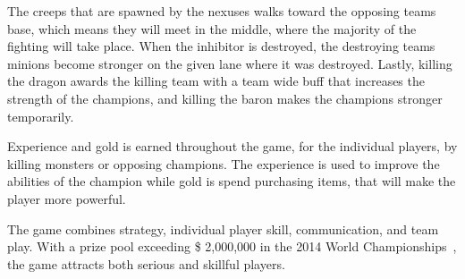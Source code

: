 The creeps that are spawned by the nexuses walks toward the opposing teams base, which means they will meet in the middle, where the majority of the fighting will take place. When the inhibitor is destroyed, the destroying teams minions become stronger on the given lane where it was destroyed. Lastly, killing the dragon awards the killing team with a team wide buff that increases the strength of the champions, and killing the baron makes the champions stronger temporarily.

Experience and gold is earned throughout the game, for the individual players, by killing monsters or opposing champions. The experience is used to improve the abilities of the champion while gold is spend purchasing items, that will make the player more powerful.

The game combines strategy, individual player skill, communication, and team play.
With a prize pool exceeding \$ 2,000,000 in the 2014 World Championships~\cite{lolprize}, the game attracts both serious and skillful players.
